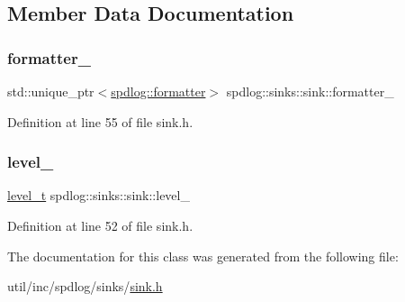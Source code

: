 \subsection{Member Data Documentation}
\mbox{\label{classspdlog_1_1sinks_1_1sink_aa0d19f09363a11b63b4a9b1d46f8a4b3}} 
\subsubsection{\texorpdfstring{formatter\+\_\+}{formatter\_}}
{\footnotesize\ttfamily std\+::unique\+\_\+ptr$<$\hyperlink{classspdlog_1_1formatter}{spdlog\+::formatter}$>$ spdlog\+::sinks\+::sink\+::formatter\+\_\+\hspace{0.3cm}{\ttfamily [protected]}}



Definition at line 55 of file sink.\+h.

\mbox{\label{classspdlog_1_1sinks_1_1sink_a435da07b59e1165b38d53635cdada30a}} 
\subsubsection{\texorpdfstring{level\+\_\+}{level\_}}
{\footnotesize\ttfamily \hyperlink{namespacespdlog_a8585bf495310a6ce695191739351709b}{level\+\_\+t} spdlog\+::sinks\+::sink\+::level\+\_\+\hspace{0.3cm}{\ttfamily [protected]}}



Definition at line 52 of file sink.\+h.



The documentation for this class was generated from the following file\+:\begin{DoxyCompactItemize}
\item 
util/inc/spdlog/sinks/\hyperlink{sink_8h}{sink.\+h}\end{DoxyCompactItemize}
